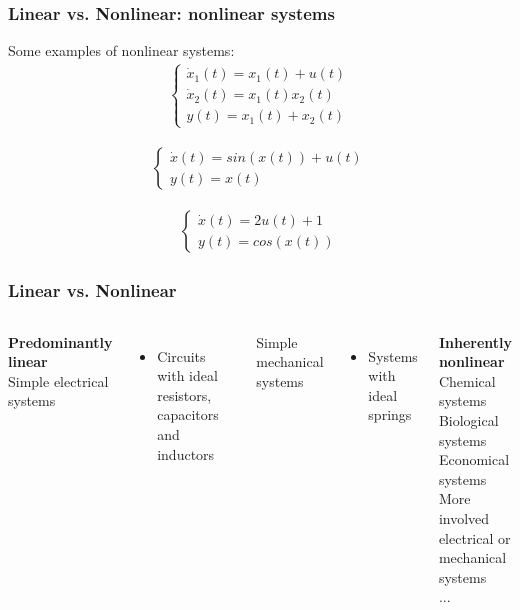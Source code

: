 \documentclass{beamer}
\begin{document}

\begin{frame}
\frametitle{Linear vs. Nonlinear: nonlinear systems}
Some examples of nonlinear systems:
\begin{align*}
\begin{cases}
\dot{x}_{1}(t) = x_{1}(t) + u(t)\\
\dot{x}_{2}(t) = x_{1}(t) x_{2}(t)\\
y(t) = x_{1}(t) + x_{2}(t)
\end{cases}
\end{align*}

\begin{align*}
\begin{cases}
\dot{x}(t) = sin(x(t)) + u(t)\\
y(t) = x(t)
\end{cases}
\end{align*}

\begin{align*}
\begin{cases}
\dot{x}(t) = 2 u(t) + 1\\
y(t) = cos(x(t))
\end{cases}
\end{align*}
\end{frame}


\begin{frame}
\frametitle{Linear vs. Nonlinear}
\begin{columns}
\textbf{\Large{Predominantly linear}}\\
\medskip
Simple electrical systems
\begin{itemize}
\item Circuits with ideal resistors, capacitors and inductors
\end{itemize}
Simple mechanical systems
\begin{itemize}
\item Systems with ideal springs
\end{itemize}

\textbf{\Large{Inherently nonlinear}}\\
\medskip
Chemical systems\\
Biological systems\\
Economical systems\\
More involved electrical or mechanical systems\\
...
\end{columns}
\end{frame}
\end{document}
